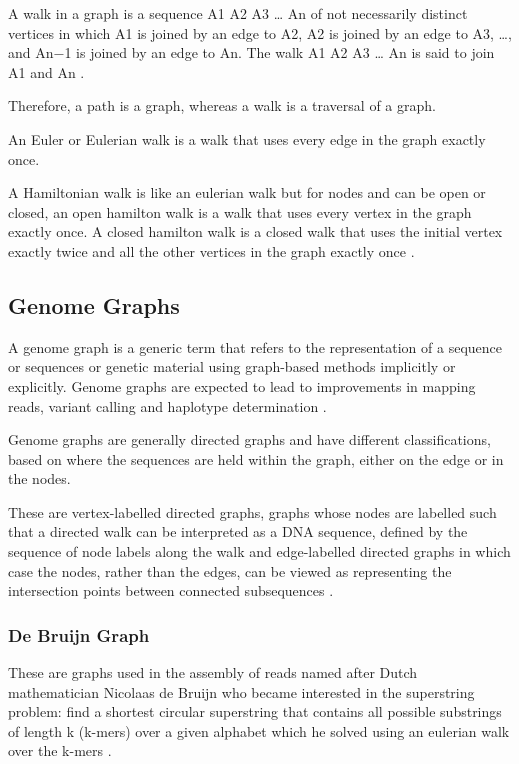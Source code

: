 \documentclass[10pt, a4paper]{article}
\begin{document}
A walk in a graph is a sequence A1 A2 A3 \ldots{} An of not necessarily distinct 
vertices in which A1 is joined by an edge to A2, A2 is joined by an edge to
A3, \ldots{}, and An−1 is joined by an edge to An. The walk A1 A2 A3 \ldots{} An is said
to join A1 and An \cite{trudeauIntroductionGraphTheory1993}.

Therefore, a path is a graph, whereas a walk is a traversal of a graph.

An Euler or Eulerian walk is a walk that uses every edge in the graph exactly
once.

A Hamiltonian walk is like an eulerian walk but for nodes and can be open or
closed, an open hamilton walk is a walk that uses every vertex in the graph
exactly once. A closed hamilton walk is a closed walk that uses the initial
vertex exactly twice and all the other vertices in the graph exactly once
\cite{trudeauIntroductionGraphTheory1993}.

\subsection{Genome Graphs}
\label{sec:org55d2e40}
A genome graph is a generic term that refers to the representation of a sequence
or sequences or genetic material using graph-based methods implicitly or
explicitly. Genome graphs are expected to lead to improvements in mapping reads,
variant calling and haplotype determination \cite{patenGenomeGraphsEvolution2017}.

Genome graphs are generally directed graphs and have different classifications,
based on where the sequences are held within the graph, either on the edge or in
the nodes.

These are vertex-labelled directed graphs, graphs whose nodes are labelled such
that a directed walk can be interpreted as a DNA sequence, defined by the
sequence of node labels along the walk and edge-labelled directed graphs in
which case the nodes, rather than the edges, can be viewed as representing the 
intersection points between connected subsequences
\cite{patenGenomeGraphsEvolution2017}.

\subsubsection{De Bruijn Graph}
\label{sec:org9b34ee3}
These are graphs used in the assembly of reads named after Dutch mathematician
Nicolaas de Bruijn who became interested in the superstring problem: find a 
shortest circular superstring that contains all possible substrings of length k
(k-mers) over a given alphabet which he solved using an eulerian walk over the
k-mers \cite{compeauHowApplyBruijn2011}.
\end{document}
